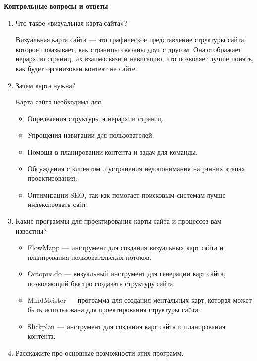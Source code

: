\textbf{Контрольные вопросы и ответы}

\begin{enumerate}
    \item Что такое «визуальная карта сайта»?

Визуальная карта сайта — это графическое представление структуры сайта, которое показывает, как страницы связаны друг с другом. Она отображает иерархию страниц, их взаимосвязи и навигацию, что позволяет лучше понять, как будет организован контент на сайте.
    \item Зачем карта нужна?

Карта сайта необходима для:
        \begin{itemize}
            \item Определения структуры и иерархии страниц.
            \item Упрощения навигации для пользователей.
            \item Помощи в планировании контента и задач для команды.
            \item Обсуждения с клиентом и устранения недопонимания на ранних этапах проектирования.
            \item Оптимизации SEO, так как помогает поисковым системам лучше индексировать сайт.
        \end{itemize}
    \item Какие программы для проектирования карты сайта и процессов вам известны?

        \begin{itemize}
            \item FlowMapp — инструмент для создания визуальных карт сайта и планирования пользовательских потоков.
            \item Octopus.do — визуальный инструмент для генерации карт сайта, позволяющий быстро создавать структуру сайта.
            \item MindMeister — программа для создания ментальных карт, которая может быть использована для проектирования структуры сайта.
            \item Slickplan — инструмент для создания карт сайта и планирования контента.
        \end{itemize}
    \item Расскажите про основные возможности этих программ.


\end{enumerate}
